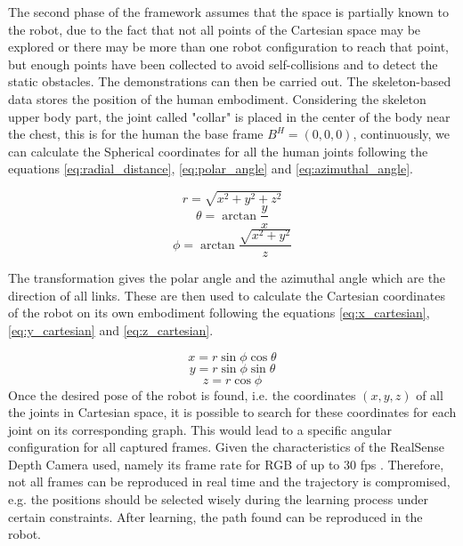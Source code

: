\documentclass[thesis]{mas_proposal}
\begin{document}
	The second phase of the framework assumes that the space is partially known to the robot, due to the fact that not all points of the Cartesian space may be explored or there may be more than one robot configuration to reach that point, but enough points have been collected to avoid self-collisions and to detect the static obstacles.  The demonstrations can then be carried out. The skeleton-based data stores the position of the human embodiment. Considering the skeleton upper body part, the joint called "collar" is placed in the center of the body near the chest, this is for the human the base frame $B^H = (0, 0, 0)$, continuously, we can calculate the Spherical coordinates for all the human joints following the equations \ref{eq:radial_distance}, \ref{eq:polar_angle} and \ref{eq:azimuthal_angle}.
	
	\begin{equation}
		 r = \sqrt{x^2 + y^2 + z^2}
	\label{eq:radial_distance}
	\end{equation}
	\begin{equation}
		\theta = \arctan \frac{y}{x}
	\label{eq:polar_angle}
	\end{equation}
	\begin{equation}
		\phi = \arctan \frac{\sqrt{x^2 + y^2}}{z}
	\label{eq:azimuthal_angle}
	\end{equation}

	The transformation gives the polar angle and the azimuthal angle which are the direction of all links. These are then used to calculate the Cartesian coordinates of the robot on its own embodiment following the equations \ref{eq:x_cartesian}, \ref{eq:y_cartesian} and \ref{eq:z_cartesian}. 
	
	\begin{equation}
		x = r \sin \phi \cos \theta
		\label{eq:x_cartesian}
	\end{equation}
	\begin{equation}
		y = r \sin \phi \sin \theta
		\label{eq:y_cartesian}
	\end{equation}
	\begin{equation}
		z = r \cos \phi
		\label{eq:z_cartesian}
	\end{equation}
	Once the desired pose of the robot is found, i.e. the coordinates $(x,y,z)$ of all the joints in Cartesian space, it is possible to search for these coordinates for each joint on its corresponding graph. This would lead to a specific angular configuration for all captured frames. Given the characteristics of the RealSense Depth Camera used, namely its frame rate for RGB of up to 30 fps \cite{realsense_manual}. Therefore, not all frames can be reproduced in real time and the trajectory is compromised, e.g. the positions should be selected wisely during the learning process under certain constraints. After learning, the path found can be reproduced in the robot.
\end{document}

